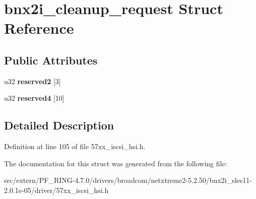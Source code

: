 \hypertarget{structbnx2i__cleanup__request}{
\section{bnx2i\_\-cleanup\_\-request Struct Reference}
\label{structbnx2i__cleanup__request}
}
\subsection*{Public Attributes}
\begin{DoxyCompactItemize}
\item 
\hypertarget{structbnx2i__cleanup__request_a01a41444dd82ddfc738ce7aa48c7f56d}{
u32 {\bfseries reserved2} \mbox{[}3\mbox{]}}
\label{structbnx2i__cleanup__request_a01a41444dd82ddfc738ce7aa48c7f56d}

\item 
\hypertarget{structbnx2i__cleanup__request_ae9e08b1629eefa1709dec4d67c8af1c9}{
u32 {\bfseries reserved4} \mbox{[}10\mbox{]}}
\label{structbnx2i__cleanup__request_ae9e08b1629eefa1709dec4d67c8af1c9}

\end{DoxyCompactItemize}


\subsection{Detailed Description}


Definition at line 105 of file 57xx\_\-iscsi\_\-hsi.h.



The documentation for this struct was generated from the following file:\begin{DoxyCompactItemize}
\item 
src/extern/PF\_\-RING-\/4.7.0/drivers/broadcom/netxtreme2-\/5.2.50/bnx2i\_\-sles11-\/2.0.1e-\/05/driver/57xx\_\-iscsi\_\-hsi.h\end{DoxyCompactItemize}
